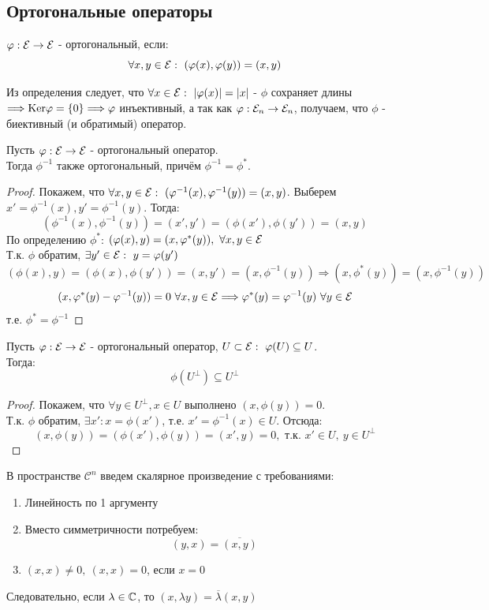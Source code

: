 \subsection{Ортогональные операторы}
\begin{definition}
    $\phi: \E \rightarrow \E$ - ортогональный, если: 
    $$\forall x,y \in \E: \ (\phi(x), \phi(y)) = (x, y)$$ 
\end{definition}
Из определения следует, что $\forall x \in \E: \ |\phi(x)| = |x|$ - $\phi$ сохраняет длины $\Longrightarrow \textup{Ker}\phi = \{0\} \Longrightarrow \phi$ инъективный, а так как $\phi: \E_n \rightarrow \E_n$, получаем, что $\phi$ - биективный (и обратимый) оператор.  
\begin{subtheorem}
    Пусть $\phi: \E \rightarrow \E$ - ортогональный оператор.\\
    Тогда $\phi^{-1}$ также ортогональный, причём $\phi^{-1} = \phi^*$.
\end{subtheorem}
\begin{proof}
    Покажем, что $\forall x,y \in \E: \ (\phi^{-1}(x), \phi^{-1}(y)) = (x, y)$. Выберем $x' = \phi^{-1}(x), y' = \phi^{-1}(y)$. Тогда:
    $$(\phi^{-1}(x), \phi^{-1}(y)) = (x', y') = (\phi(x'), \phi(y')) = (x, y)$$
    По определению $\phi^*$: $(\phi(x), y) = (x,\phi^*(y)), \ \forall x, y \in \E$\\
    Т.к. $\phi$ обратим, $\exists y' \in \E: \ y = \phi(y')$
    $$(\phi(x), y) = (\phi(x), \phi(y')) = (x, y') = (x, \phi^{-1}(y)) \Longrightarrow (x, \phi^*(y)) = (x, \phi^{-1}(y))$$
    $$(x, \phi^*(y) - \phi^{-1}(y)) = 0 \ \forall x,y \in \E \Longrightarrow \phi^*(y) = \phi^{-1}(y) \ \forall y \in \E$$
    т.е. $\phi^* = \phi^{-1}$
\end{proof}
\begin{lemma}
    Пусть $\phi: \E \rightarrow \E$ - ортогональный оператор, $U \subset \E: \ \phi(U) \subseteq U$.\\
    Тогда: $$\phi(U^\perp) \subseteq U^\perp$$
\end{lemma}
\begin{proof}
    Покажем, что $\forall y \in U^\perp, x \in U$ выполнено $(x, \phi(y)) = 0$.\\
    Т.к. $\phi$ обратим, $\exists x': x = \phi(x')$, т.е. $x' = \phi^{-1}(x) \in U$. Отсюда:
    $$(x, \phi(y)) = (\phi(x'), \phi(y)) = (x', y) = 0, \text{ т.к. } x' \in U, \ y \in U^\perp$$
\end{proof}
\begin{definition}
    В пространстве $\mathcal{C}^n$ введем скалярное произведение с требованиями:
\begin{enumerate}
    \item Линейность по 1 аргументу
    \item Вместо симметричности потребуем:
    $$(y,x) = \overline{(x,y)}$$
    \item $(x,x) \neq 0, \ (x,x) = 0$, если $x=0$   
\end{enumerate}
Следовательно, если $\lambda \in \CC$, то $(x,\lambda y) = \overline{\lambda}(x,y)$ 
\end{definition}
